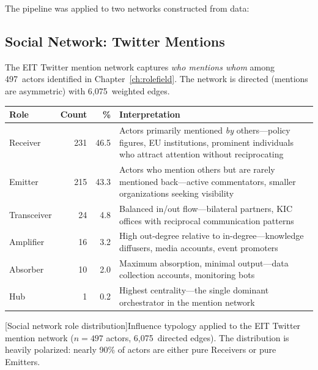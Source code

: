 \documentclass[../main.tex]{subfiles}
\begin{document}
The \RoleSim{} pipeline was applied to two networks constructed from
\RoleBox{} data:

\subsection*{Social Network: Twitter Mentions}

The EIT Twitter mention network captures \emph{who mentions whom} among
497~actors identified in Chapter~\ref{ch:rolefield}.
The network is directed (mentions are asymmetric) with 6,075~weighted edges.

\begin{center}
\scriptsize
\begin{tabular}{@{}lrrp{5cm}@{}}
\toprule
\textbf{Role} & \textbf{Count} & \textbf{\%} & \textbf{Interpretation} \\
\midrule
Receiver   & 231 & 46.5 & Actors primarily mentioned \emph{by} others---policy
  figures, EU institutions, prominent individuals who attract attention
  without reciprocating \\
\addlinespace
Emitter    & 215 & 43.3 & Actors who mention others but are rarely mentioned
  back---active commentators, smaller organizations seeking visibility \\
\addlinespace
Transceiver & 24 &  4.8 & Balanced in/out flow---bilateral partners, KIC
  offices with reciprocal communication patterns \\
\addlinespace
Amplifier  &  16 &  3.2 & High out-degree relative to in-degree---knowledge
  diffusers, media accounts, event promoters \\
\addlinespace
Absorber   &  10 &  2.0 & Maximum absorption, minimal output---data
  collection accounts, monitoring bots \\
\addlinespace
Hub        &   1 &  0.2 & Highest centrality---the single dominant
  orchestrator in the mention network \\
\bottomrule
\end{tabular}
[Social network role distribution]{Influence typology applied
to the EIT Twitter mention network ($n = 497$ actors, 6,075~directed edges).
The distribution is heavily polarized: nearly 90\% of actors are either pure
Receivers or pure Emitters.}
\end{center}
\end{document}
